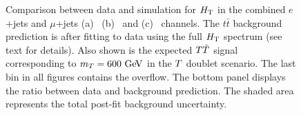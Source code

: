 \begin{figure}[htb]\begin{center}
	\caption{Comparison between data and simulation for $\HT$ in the combined
$e$+jets and $\mu$+jets (a) \chii\ (b) \chiii\ and (c) \chiv\ channels.
The $t\bar{t}$ background prediction is after fitting to data using the full $\HT$ spectrum (see text for details).
Also shown is the expected $\TT$ signal corresponding to $m_{\T}=600\gev$ in the $\T$ doublet scenario.
The last bin in all figures contains the overflow. The bottom panel displays the ratio between data
and background prediction. The shaded area represents the total post-fit background uncertainty.
\label{fig:HT_SignalRegion}}
\end{center}\end{figure}


